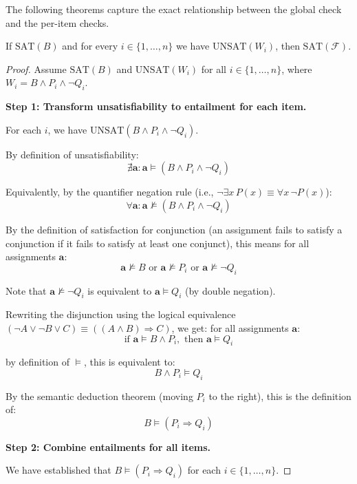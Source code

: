 The following theorems capture the exact relationship between the global check and the per-item checks.

\begin{theorem}
\label{thm:soundness}
If $\mathrm{SAT}(B)$ and for every $i \in \{1, \ldots, n\}$ we have $\mathrm{UNSAT}(W_i)$, then $\mathrm{SAT}(\mathcal{F})$.
\end{theorem}

\begin{proof}
Assume $\mathrm{SAT}(B)$ and $\mathrm{UNSAT}(W_i)$ for all $i \in \{1, \ldots, n\}$, where $W_i = B \wedge P_i \wedge \lnot Q_i$.

\textbf{Step 1: Transform unsatisfiability to entailment for each item.}

For each $i$, we have $\mathrm{UNSAT}(B \wedge P_i \wedge \lnot Q_i)$.

By definition of unsatisfiability:
\[
  \nexists \mathbf{a} : \mathbf{a} \models (B \wedge P_i \wedge \lnot Q_i)
\]

Equivalently, by the quantifier negation rule (i.e., $\neg \exists x \, P(x) \equiv \forall x \, \neg P(x)$):
\[
  \forall \mathbf{a} : \mathbf{a} \not\models (B \wedge P_i \wedge \lnot Q_i)
\]

By the definition of satisfaction for conjunction (an assignment fails to satisfy a conjunction if it fails to satisfy at least one conjunct), this means for all assignments $\mathbf{a}$:
\[
  \mathbf{a} \not\models B \text{ or } \mathbf{a} \not\models P_i \text{ or } \mathbf{a} \not\models \lnot Q_i
\]

Note that $\mathbf{a} \not\models \lnot Q_i$ is equivalent to $\mathbf{a} \models Q_i$ (by double negation).

Rewriting the disjunction using the logical equivalence $(\neg A \vee \neg B \vee C) \equiv ((A \wedge B) \Rightarrow C)$, we get: for all assignments $\mathbf{a}$:
\[
  \text{if } \mathbf{a} \models B \wedge P_i, \text{ then } \mathbf{a} \models Q_i
\]

by definition of $\models$, this is equivalent to:
\[
  B \wedge P_i \models Q_i
\]

By the semantic deduction theorem (moving $P_i$ to the right), this is the definition of:
\[
  B \models (P_i \Rightarrow Q_i)
\]

\textbf{Step 2: Combine entailments for all items.}

We have established that $B \models (P_i \Rightarrow Q_i)$ for each $i \in \{1, \ldots, n\}$.


\end{proof}
